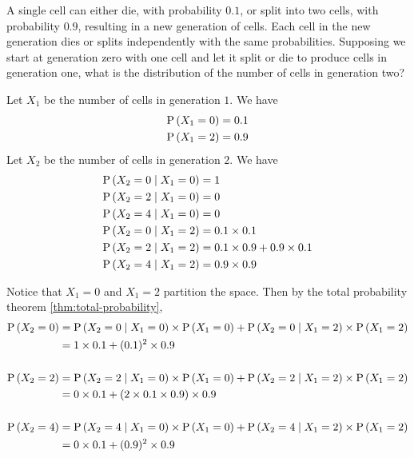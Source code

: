 \documentclass[11pt]{article}
\begin{document}
\begin{eg}
    A single cell can either die, with probability $0.1$, or split into two
    cells, with probability $0.9$, resulting in a new generation of cells. Each
    cell in the new generation dies or splits independently with the same
    probabilities. Supposing we start at generation zero with one cell and let
    it split or die to produce cells in generation one, what is the
    distribution of the number of cells in generation two?
\end{eg}

\begin{solution}
    Let $X_1$ be the number of cells in generation $1$. We have
    \begin{align*}
        \P{X_1 = 0} &= 0.1 \\
        \P{X_1 = 2} &= 0.9
    \end{align*}
    Let $X_2$ be the number of cells in generation $2$. We have
    \begin{align*}
        \P{X_2 = 0 \given X_1 = 0} &= 1 \\
        \P{X_2 = 2 \given X_1 = 0} &= 0 \\
        \P{X_2 = 4 \given X_1 = 0} &= 0 \\
        \P{X_2 = 0 \given X_1 = 2} &= 0.1 \times 0.1 \\
        \P{X_2 = 2 \given X_1 = 2} &= 0.1 \times 0.9 + 0.9 \times 0.1 \\
        \P{X_2 = 4 \given X_1 = 2} &= 0.9 \times 0.9
    \end{align*}

    Notice that $X_1 = 0$ and $X_1 = 2$ partition the space.
    Then by the total probability theorem \eqref{thm:total-probability},
    \begin{align*}
        \P{X_2 = 0}
        &= \P{X_2 = 0 \given X_1 = 0} \times \P{X_1 = 0}
        + \P{X_2 = 0 \given X_1 = 2} \times \P{X_1 = 2} \\
        &= 1 \times 0.1 + (0.1)^2 \times 0.9 \\
        \\
        \P{X_2 = 2}
        &= \P{X_2 = 2 \given X_1 = 0} \times \P{X_1 = 0}
        + \P{X_2 = 2 \given X_1 = 2} \times \P{X_1 = 2} \\
        &= 0 \times 0.1 + (2 \times 0.1 \times 0.9) \times 0.9 \\
        \\
        \P{X_2 = 4}
        &= \P{X_2 = 4 \given X_1 = 0} \times \P{X_1 = 0}
        + \P{X_2 = 4 \given X_1 = 2} \times \P{X_1 = 2} \\
        &= 0 \times 0.1 + (0.9)^2\times 0.9
    \end{align*}
\end{solution}
\end{document}
